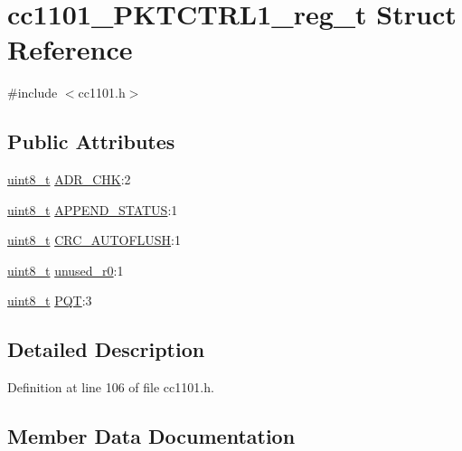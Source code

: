 \hypertarget{structcc1101___p_k_t_c_t_r_l1__reg__t}{}\section{cc1101\+\_\+\+P\+K\+T\+C\+T\+R\+L1\+\_\+reg\+\_\+t Struct Reference}
\label{structcc1101___p_k_t_c_t_r_l1__reg__t}


{\ttfamily \#include $<$cc1101.\+h$>$}

\subsection*{Public Attributes}
\begin{DoxyCompactItemize}
\item 
\hyperlink{_p_e___types_8h_aba7bc1797add20fe3efdf37ced1182c5}{uint8\+\_\+t} \hyperlink{structcc1101___p_k_t_c_t_r_l1__reg__t_adec11a2a1613d5300121a232d1469583}{A\+D\+R\+\_\+\+C\+HK}\+:2
\item 
\hyperlink{_p_e___types_8h_aba7bc1797add20fe3efdf37ced1182c5}{uint8\+\_\+t} \hyperlink{structcc1101___p_k_t_c_t_r_l1__reg__t_adef6275b1e7903c6d473808f77f16d5b}{A\+P\+P\+E\+N\+D\+\_\+\+S\+T\+A\+T\+US}\+:1
\item 
\hyperlink{_p_e___types_8h_aba7bc1797add20fe3efdf37ced1182c5}{uint8\+\_\+t} \hyperlink{structcc1101___p_k_t_c_t_r_l1__reg__t_a0598b797936e538225205c2ccf419f31}{C\+R\+C\+\_\+\+A\+U\+T\+O\+F\+L\+U\+SH}\+:1
\item 
\hyperlink{_p_e___types_8h_aba7bc1797add20fe3efdf37ced1182c5}{uint8\+\_\+t} \hyperlink{structcc1101___p_k_t_c_t_r_l1__reg__t_a730c3743ec1c3813c8eef71ec40ee080}{unused\+\_\+r0}\+:1
\item 
\hyperlink{_p_e___types_8h_aba7bc1797add20fe3efdf37ced1182c5}{uint8\+\_\+t} \hyperlink{structcc1101___p_k_t_c_t_r_l1__reg__t_a8c83755e7456f1894f749982fabd87ad}{P\+QT}\+:3
\end{DoxyCompactItemize}


\subsection{Detailed Description}


Definition at line 106 of file cc1101.\+h.



\subsection{Member Data Documentation}
